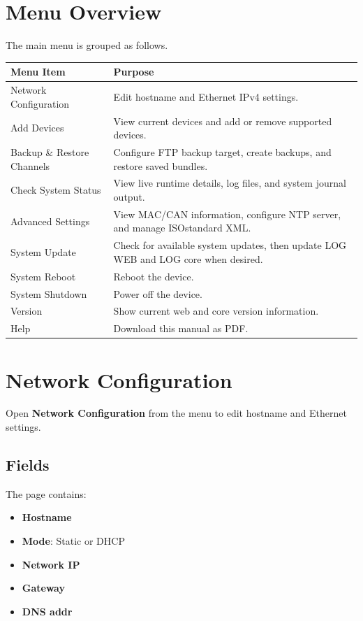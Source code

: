 \documentclass[11pt,a4paper]{article}
\begin{document}
\section{Menu Overview}
The main menu is grouped as follows.

\begin{longtable}{|p{}|p{}|}
\hline
\textbf{Menu Item} & \textbf{Purpose} \\
\hline
Network Configuration & Edit hostname and Ethernet IPv4 settings. \\
\hline
Add Devices & View current devices and add or remove supported devices. \\
\hline
Backup \& Restore Channels & Configure FTP backup target, create backups, and restore saved bundles. \\
\hline
Check System Status & View live runtime details, log files, and system journal output. \\
\hline
Advanced Settings & View MAC/CAN information, configure NTP server, and manage ISOstandard XML. \\
\hline
System Update & Check for available system updates, then update LOG WEB and LOG core when desired. \\
\hline
System Reboot & Reboot the device. \\
\hline
System Shutdown & Power off the device. \\
\hline
Version & Show current web and core version information. \\
\hline
Help & Download this manual as PDF. \\
\hline
\end{longtable}

\section{Network Configuration}
Open \textbf{Network Configuration} from the menu to edit hostname and Ethernet settings.

\subsection{Fields}
The page contains:

\begin{itemize}
\item \textbf{Hostname}
\item \textbf{Mode}: Static or DHCP
\item \textbf{Network IP}
\item \textbf{Gateway}
\item \textbf{DNS addr}
\end{itemize}
\end{document}
